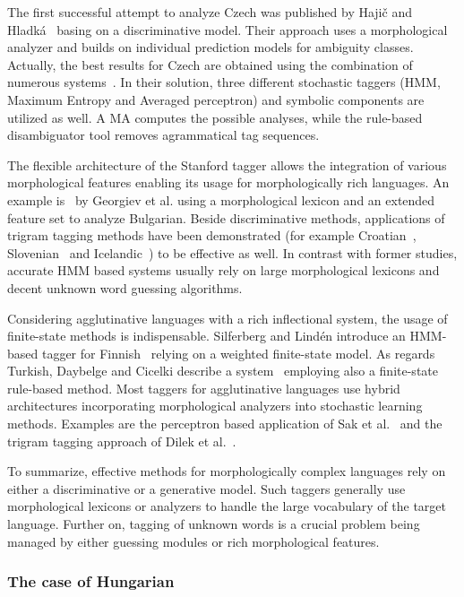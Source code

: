 The first successful attempt to analyze Czech was published by Hajič and Hladká~\cite{Hajic1998a} basing on a discriminative model.
Their approach uses a morphological analyzer and builds on individual prediction models for ambiguity classes.
Actually, the best results for Czech are obtained using the combination of numerous systems~\cite{Hajic2007}.
In their solution, three different stochastic taggers (HMM, Maximum Entropy and Averaged perceptron) and symbolic components are utilized as well.
A MA computes the possible analyses, while the rule-based disambiguator tool removes agrammatical tag sequences. 

The flexible architecture of the Stanford tagger allows the integration of various morphological features enabling its usage for morphologically rich languages.
An example is~\cite{Georgiev2012} by Georgiev et al. using a morphological lexicon and an extended feature set to analyze Bulgarian.
Beside discriminative methods, applications of trigram tagging methods have been demonstrated (for example Croatian~\cite{Agic2013}, Slovenian~\cite{Agic2013} and Icelandic~\cite{Loftsson2007}) to be effective as well.
In contrast with former studies, accurate HMM based systems usually rely on large morphological lexicons and decent unknown word guessing algorithms.

Considering agglutinative languages with a rich inflectional system, the usage of finite-state methods is indispensable.
Silferberg and Lindén introduce an HMM-based tagger for Finnish~\cite{Silfverberg2011} relying on a weighted finite-state model.
As regards Turkish, Daybelge and Cicelki describe a system~\cite{Daybelge2007} employing also a finite-state rule-based method.
Most taggers for agglutinative languages use hybrid architectures incorporating morphological analyzers into stochastic learning methods.
Examples are the perceptron based application of Sak et al.~\cite{Sak2007} and the trigram tagging approach of Dilek et al.~\cite{Hakkani-Tur2002}.

To summarize, effective methods for morphologically complex languages rely on either a discriminative or a generative model.
Such taggers generally use morphological lexicons or analyzers to handle the large vocabulary of the target language.
Further on, tagging of unknown words is a crucial problem being managed by either guessing modules or rich morphological features. 

\subsubsection{The case of Hungarian}

